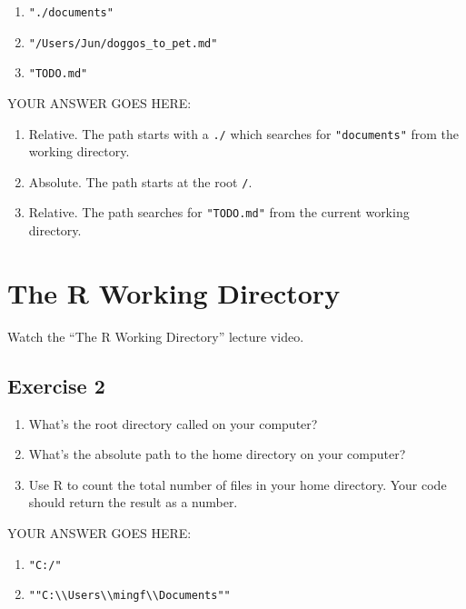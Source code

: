 \documentclass[
]{article}
\providecommand{\tightlist}{%
  \setlength{\itemsep}{0pt}\setlength{\parskip}{0pt}}
\begin{document}
\begin{enumerate}
\def\labelenumi{\arabic{enumi}.}
\tightlist
\item
  \texttt{"./documents"}
\item
  \texttt{"/Users/Jun/doggos\_to\_pet.md"}
\item
  \texttt{"TODO.md"}
\end{enumerate}

YOUR ANSWER GOES HERE:

\begin{enumerate}
\def\labelenumi{\arabic{enumi}.}
\item
  Relative. The path starts with a \texttt{./} which searches for
  \texttt{"documents"} from the working directory.
\item
  Absolute. The path starts at the root \texttt{/}.
\item
  Relative. The path searches for \texttt{"TODO.md"} from the current
  working directory.
\end{enumerate}

\hypertarget{the-r-working-directory}{%
\section{The R Working Directory}\label{the-r-working-directory}}

Watch the ``The R Working Directory'' lecture video.

\hypertarget{exercise-2}{%
\subsection{Exercise 2}\label{exercise-2}}

\begin{enumerate}
\def\labelenumi{\arabic{enumi}.}
\tightlist
\item
  What's the root directory called on your computer?
\item
  What's the absolute path to the home directory on your computer?
\item
  Use R to count the total number of files in your home directory. Your
  code should return the result as a number.
\end{enumerate}

YOUR ANSWER GOES HERE:

\begin{enumerate}
\def\labelenumi{\arabic{enumi}.}
\item
  \texttt{"C:/"}
\item
  \texttt{""C:\textbackslash{}\textbackslash{}Users\textbackslash{}\textbackslash{}mingf\textbackslash{}\textbackslash{}Documents""}
\end{enumerate}
\end{document}
